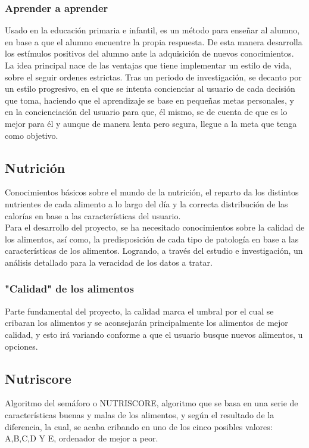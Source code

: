 \subsubsection{Aprender a aprender \cite{autoAprendizajeForma}}
Usado en la educación primaria e infantil, es un método para enseñar al alumno, en base a que el alumno encuentre la propia respuesta. De esta manera desarrolla los estímulos positivos del alumno ante la adquisición de nuevos conocimientos. \\
La idea principal nace de las ventajas que tiene implementar un estilo de vida, sobre el seguir ordenes estrictas. Tras un periodo de investigación, se decanto por un estilo progresivo, en el que se intenta concienciar al usuario de cada decisión que toma, haciendo que el aprendizaje se base en pequeñas metas personales, y en la concienciación del usuario para que, él mismo, se de cuenta de que es lo mejor para él y aunque de manera lenta pero segura, llegue a la meta que tenga como objetivo.
\subsection{Nutrición}
Conocimientos básicos sobre el mundo de la nutrición, el reparto da los distintos nutrientes de cada alimento a lo largo del día y la correcta distribución de las calorías en base a las características del usuario.\\

Para el desarrollo del proyecto, se ha necesitado conocimientos sobre la calidad de los alimentos, así como, la predisposición de cada tipo de patología en base a las características de los alimentos. Logrando, a través del estudio e investigación, un análisis detallado para la veracidad de los datos a tratar.
\subsubsection{"Calidad" de los alimentos}
Parte fundamental del proyecto, la calidad marca el umbral por el cual se cribaran los alimentos y se aconsejarán principalmente los alimentos de mejor calidad, y esto irá variando conforme a que  el usuario busque nuevos alimentos, u opciones.
\subsection{Nutriscore}
Algoritmo del semáforo o NUTRISCORE, algoritmo que se basa en una serie de características buenas y malas de los alimentos, y según el resultado de la diferencia, la cual, se acaba cribando en uno de los cinco posibles valores: A,B,C,D Y E, ordenador de mejor a peor.\\

